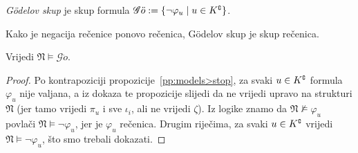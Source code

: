\begin{definicija}[{name=[G\"odelov skup]}]
\emph{G\"odelov skup} je skup formula
    $\mathscr G\ddot o:=\{\lnot\varphi_u\mid u\in K\sp{{\scriptscriptstyle\complement}}\}$.
\end{definicija}
Kako je negacija rečenice ponovo rečenica, G\"odelov skup je skup rečenica.

\begin{propozicija}[{name=[istinitost G\"odelovog skupa rečenica u $\mathfrak N$]}]
Vrijedi $\mathfrak N\models\mathscr G\ddot o$.
\end{propozicija}
\begin{proof}
Po kontrapoziciji propozicije~\ref{pp:models>stop}, za svaki $u\in K\sp{{\scriptscriptstyle\complement}}$ formula $\varphi_u$ nije valjana, a iz dokaza te propozicije slijedi da ne vrijedi upravo na strukturi $\mathfrak N$ (jer tamo vrijedi $\pi_u$ i sve $\iota_i$, ali ne vrijedi $\zeta$). Iz logike znamo da $\mathfrak N\nvDash\varphi_u$ povlači $\mathfrak N\models\lnot\varphi_u$, jer je $\varphi_u$ rečenica. Drugim riječima, za svaki $u\in K\sp{{\scriptscriptstyle\complement}}$ vrijedi $\mathfrak N\models\lnot\varphi_u$, što smo trebali dokazati.
\end{proof}


